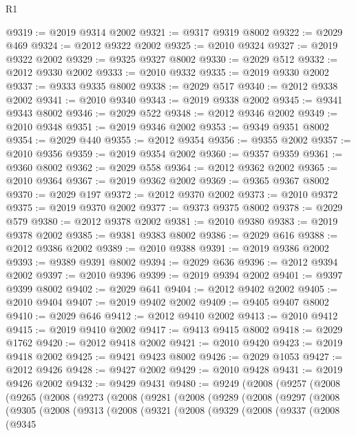 \begin{lexlean}{R1}
\begin{coremodule}
@9319 := @2019 @9314 @2002
@9321 := @9317 @9319 @8002
@9322 := @2029 @469
@9324 := @2012 @9322 @2002
@9325 := @2010 @9324
@9327 := @2019 @9322 @2002
@9329 := @9325 @9327 @8002
@9330 := @2029 @512
@9332 := @2012 @9330 @2002
@9333 := @2010 @9332
@9335 := @2019 @9330 @2002
@9337 := @9333 @9335 @8002
@9338 := @2029 @517
@9340 := @2012 @9338 @2002
@9341 := @2010 @9340
@9343 := @2019 @9338 @2002
@9345 := @9341 @9343 @8002
@9346 := @2029 @522
@9348 := @2012 @9346 @2002
@9349 := @2010 @9348
@9351 := @2019 @9346 @2002
@9353 := @9349 @9351 @8002
@9354 := @2029 @440
@9355 := @2012 @9354
@9356 := @9355 @2002
@9357 := @2010 @9356
@9359 := @2019 @9354 @2002
@9360 := @9357 @9359
@9361 := @9360 @8002
@9362 := @2029 @558
@9364 := @2012 @9362 @2002
@9365 := @2010 @9364
@9367 := @2019 @9362 @2002
@9369 := @9365 @9367 @8002
@9370 := @2029 @197
@9372 := @2012 @9370 @2002
@9373 := @2010 @9372
@9375 := @2019 @9370 @2002
@9377 := @9373 @9375 @8002
@9378 := @2029 @579
@9380 := @2012 @9378 @2002
@9381 := @2010 @9380
@9383 := @2019 @9378 @2002
@9385 := @9381 @9383 @8002
@9386 := @2029 @616
@9388 := @2012 @9386 @2002
@9389 := @2010 @9388
@9391 := @2019 @9386 @2002
@9393 := @9389 @9391 @8002
@9394 := @2029 @636
@9396 := @2012 @9394 @2002
@9397 := @2010 @9396
@9399 := @2019 @9394 @2002
@9401 := @9397 @9399 @8002
@9402 := @2029 @641
@9404 := @2012 @9402 @2002
@9405 := @2010 @9404
@9407 := @2019 @9402 @2002
@9409 := @9405 @9407 @8002
@9410 := @2029 @646
@9412 := @2012 @9410 @2002
@9413 := @2010 @9412
@9415 := @2019 @9410 @2002
@9417 := @9413 @9415 @8002
@9418 := @2029 @1762
@9420 := @2012 @9418 @2002
@9421 := @2010 @9420
@9423 := @2019 @9418 @2002
@9425 := @9421 @9423 @8002
@9426 := @2029 @1053
@9427 := @2012 @9426
@9428 := @9427 @2002
@9429 := @2010 @9428
@9431 := @2019 @9426 @2002
@9432 := @9429 @9431
@9480 := @9249
    (@2008
      (@9257
        (@2008
          (@9265
            (@2008
              (@9273
                (@2008
                  (@9281
                    (@2008
                      (@9289
                        (@2008
                          (@9297
                            (@2008
                              (@9305
                                (@2008
                                  (@9313
                                    (@2008
                                      (@9321
                                        (@2008
                                          (@9329
                                            (@2008
                                              (@9337
                                                (@2008
                                                  (@9345

\end{coremodule}
\end{lexlean}
